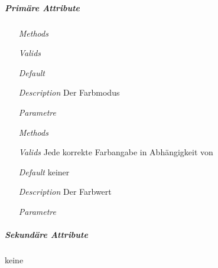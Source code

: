\subparagraph{Prim\"are Attribute}
\begin{description}
\item {}
\begin{enumerate}
\item[\textit{Methods}]
\item[\textit{Valids}] 
\item[\textit{Default}] 
\item[\textit{Description}] Der Farbmodus
\item[\textit{Parametre}] 
\end{enumerate}

\item {}
\begin{enumerate}
\item[\textit{Methods}] 
\item[\textit{Valids}] Jede korrekte Farbangabe in Abh\"angigkeit
von 
\item[\textit{Default}] keiner
\item[\textit{Description}] Der Farbwert
\item[\textit{Parametre}] 
\end{enumerate}

\end{description}

\newpage

\subparagraph{Sekund\"are Attribute}
keine

\newpage

